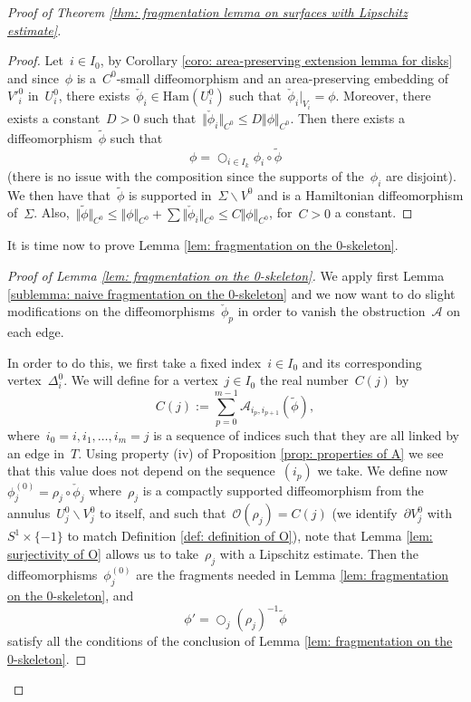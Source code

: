 \documentclass[10pt]{amsart}
\newcommand{\Ham}{\mathrm{Ham}}
\begin{document}
\begin{proof}[Proof of Theorem \ref{thm: fragmentation lemma on surfaces with Lipschitz estimate}]
\begin{proof}
Let~$i \in I_0$, by Corollary \ref{coro: area-preserving extension lemma for disks} and since~$\phi$ is a~$C^0$-small diffeomorphism and an area-preserving embedding of~$V'^0_i$ in~$U_i^{0}$, there exists~$\check\phi_i\in \Ham(U_i^0)$ such that~$\check\phi_i\vert_{V_i}=\phi$. Moreover, there exists a constant~$D>0$ such that~$\Vert \check\phi_i \Vert_{C^0}\leq D \Vert \phi \Vert_{C^0}$. Then there exists a diffeomorphism~$\widetilde{\phi}$ such that
$$\phi=\bigcirc_{i\in I_k}\phi_i \circ \widetilde{\phi}$$ 
(there is no issue with the composition since the supports of the~$\phi_i$ are disjoint). We then have that~$\widetilde{\phi}$ is supported in~$\Sigma\backslash V^0$ and is a Hamiltonian diffeomorphism of~$\Sigma$. Also,~$\Vert \widetilde{\phi} \Vert_{C^0} \leq \Vert\phi\Vert_{C^0}+\sum \Vert \check \phi_i\Vert_{C^0}\leq C \Vert \phi\Vert_{C^0}$, for~$C>0$ a constant.
\end{proof}

It is time now to prove Lemma \ref{lem: fragmentation on the 0-skeleton}.

\begin{proof}[Proof of Lemma \ref{lem: fragmentation on the 0-skeleton}]

We apply first Lemma \ref{sublemma: naive fragmentation on the 0-skeleton} and we now want to do slight modifications on the diffeomorphisms~$\check \phi_p$ in order to vanish the obstruction~$\mathcal{A}$ on each edge.

In order to do this, we first take a fixed index~$i\in I_0$ and its corresponding vertex~$\Delta_i^0$. We will define for a vertex~$j\in I_0$ the real number~$C(j)$ by~$$C(j):=\sum_{p=0}^{m-1}\mathcal{A}_{i_p,i_{p+1}}(\widetilde\phi),$$
where~$i_0=i,i_1,\ldots,i_m=j$ is a sequence of indices such that they are all linked by an edge in~$T$. Using property (iv) of Proposition \ref{prop: properties of A} we see that this value does not depend on the sequence~$(i_p)$ we take. We define now~$\phi_j^{(0)}=\rho_{j}\circ \check \phi_j$ where~$\rho_j$ is a compactly supported diffeomorphism from the annulus~$U_j^0\backslash V_j^0$ to itself, and such that~$\mathcal{O}(\rho_j)=C(j)$ (we identify~$\partial V_j^0$ with~$S^1 \times \{-1\}$ to match Definition \ref{def: definition of O}), note that Lemma \ref{lem: surjectivity of O} allows us to take~$\rho_j$ with a Lipschitz estimate. Then the diffeomorphisms~$\phi_j^{(0)}$ are the fragments needed in Lemma \ref{lem: fragmentation on the 0-skeleton}, and~$$\phi'=\bigcirc_{j} (\rho_j)^{-1}\widetilde{\phi}$$ satisfy all the conditions of the conclusion of Lemma \ref{lem: fragmentation on the 0-skeleton}.


\end{proof}
\end{proof}
\end{document}
